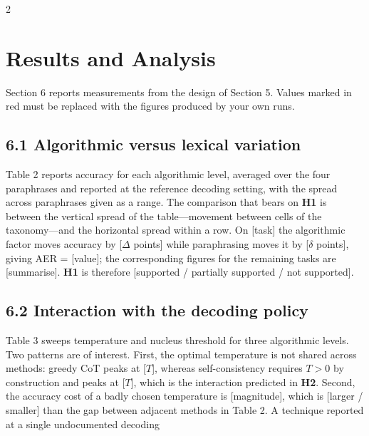 \documentclass{article}
\begin{document}
\begin{multicols}{2}
\section{Results and Analysis}

Section 6 reports measurements from the design of Section 5. Values marked in red must be replaced with the figures produced by your own runs.

\subsection{6.1 Algorithmic versus lexical variation}

Table 2 reports accuracy for each algorithmic level, averaged over the four paraphrases and reported at the reference decoding setting, with the spread across paraphrases given as a range. The comparison that bears on \textbf{H1} is between the vertical spread of the table---movement between cells of the taxonomy---and the horizontal spread within a row. On \textcolor{BrickRed}{[task]} the algorithmic factor moves accuracy by \textcolor{BrickRed}{[$\Delta$ points]} while paraphrasing moves it by \textcolor{BrickRed}{[$\delta$ points]}, giving AER = \textcolor{BrickRed}{[value]}; the corresponding figures for the remaining tasks are \textcolor{BrickRed}{[summarise]}. \textbf{H1} is therefore \textcolor{BrickRed}{[supported / partially supported / not supported]}.

\subsection{6.2 Interaction with the decoding policy}

Table 3 sweeps temperature and nucleus threshold for three algorithmic levels. Two patterns are of interest. First, the optimal temperature is not shared across methods: greedy CoT peaks at \textcolor{BrickRed}{[$T$]}, whereas self-consistency requires $T > 0$ by construction and peaks at \textcolor{BrickRed}{[$T$]}, which is the interaction predicted in \textbf{H2}. Second, the accuracy cost of a badly chosen temperature is \textcolor{BrickRed}{[magnitude]}, which is \textcolor{BrickRed}{[larger / smaller]} than the gap between adjacent methods in Table 2. A technique reported at a single undocumented decoding


\end{multicols}
\end{document}

